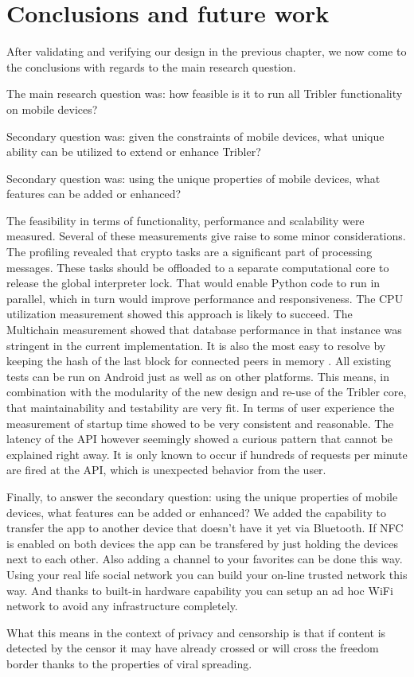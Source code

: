 \chapter{Conclusions and future work}
After validating and verifying our design in the previous chapter, we now come to the conclusions with regards to the main research question.

The main research question was: how feasible is it to run all Tribler functionality on mobile devices? %

Secondary question was: given the constraints of mobile devices, what unique ability can be utilized to extend or enhance Tribler?

Secondary question was: using the unique properties of mobile devices, what features can be added or enhanced?


The feasibility in terms of functionality, performance and scalability were measured.
Several of these measurements give raise to some minor considerations.
The profiling revealed that crypto tasks are a significant part of processing messages.
These tasks should be offloaded to a separate computational core to release the global interpreter lock.
That would enable Python code to run in parallel, which in turn would improve performance and responsiveness.
The CPU utilization measurement showed this approach is likely to succeed.
The Multichain measurement showed that database performance in that instance was stringent in the current implementation.
It is also the most easy to resolve by keeping the hash of the last block for connected peers in memory .
All existing tests can be run on Android just as well as on other platforms.
This means, in combination with the modularity of the new design and re-use of the Tribler core, that maintainability and testability are very fit.
In terms of user experience the measurement of startup time showed to be very consistent and reasonable.
The latency of the API however seemingly showed a curious pattern that cannot be explained right away.
It is only known to occur if hundreds of requests per minute are fired at the API, which is unexpected behavior from the user.

Finally, to answer the secondary question: using the unique properties of mobile devices, what features can be added or enhanced?
We added the capability to transfer the app to another device that doesn't have it yet via Bluetooth.
If NFC is enabled on both devices the app can be transfered by just holding the devices next to each other.
Also adding a channel to your favorites can be done this way.
Using your real life social network you can build your on-line trusted network this way.
And thanks to built-in hardware capability you can setup an ad hoc WiFi network to avoid any infrastructure completely.


What this means in the context of privacy and censorship is that if content is detected by the censor it may have already crossed or will cross the freedom border thanks to the properties of viral spreading.

